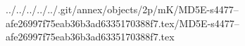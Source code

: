 ../../../../../.git/annex/objects/2p/mK/MD5E-s4477--afe26997f75eab36b3ad6335170388f7.tex/MD5E-s4477--afe26997f75eab36b3ad6335170388f7.tex